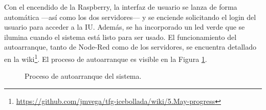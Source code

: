 Con el encendido de la Raspberry, la interfaz de usuario se lanza de forma automática ---así como los dos servidores--- y se enciende solicitando el login del usuario para acceder a la IU. Además, se ha incorporado un led verde que se ilumina cuando el sistema está listo para ser usado. El funcionamiento del autoarranque, tanto de Node-Red como de los servidores, se encuentra detallado en la wiki\footnote{\url{https://github.com/jmvega/tfg-icebollada/wiki/5.May-progress}}. El proceso de autoarranque es visible en la Figura \ref{fig:autoarranque}.
\begin{figure}[h!]
  \begin{center}
    \hspace{1mm}
    \hspace{1mm}
    \hspace{1mm}
  \end{center}
\caption{Proceso de autoarranque del sistema.} \label{fig:autoarranque}
\end{figure}

